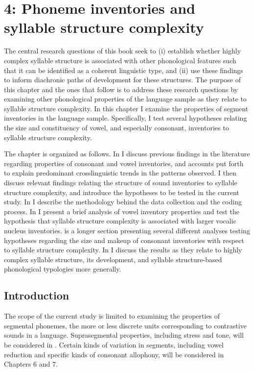 \chapter{4: Phoneme inventories and syllable structure complexity}

  The central research questions of this book seek to (i) establish whether highly complex syllable structure is associated with other phonological features such that it can be identified as a coherent linguistic type, and (ii) use these findings to inform diachronic paths of development for these structures. The purpose of this chapter and the ones that follow is to address these research questions by examining other phonological properties of the language sample as they relate to syllable structure complexity. In this chapter I examine the properties of segment inventories in the language sample. Specifically, I test several hypotheses relating the size and constituency of vowel, and especially consonant, inventories to syllable structure complexity.

  The chapter is organized as follows. In  I discuss previous findings in the literature regarding properties of consonant and vowel inventories, and accounts put forth to explain predominant crosslinguistic trends in the patterns observed. I then discuss relevant findings relating the structure of sound inventories to syllable structure complexity, and introduce the hypotheses to be tested in the current study. In  I describe the methodology behind the data collection and the coding process. In  I present a brief analysis of vowel inventory properties and test the hypothesis that syllable structure complexity is associated with larger vocalic nucleus inventories.  is a longer section presenting several different analyses testing hypotheses regarding the size and makeup of consonant inventories with respect to syllable structure complexity. In  I discuss the results as they relate to highly complex syllable structure, its development, and syllable structure-based phonological typologies more generally.

\section{Introduction}\label{sec:4.1}

  The scope of the current study is limited to examining the properties of segmental phonemes, the more or less discrete units corresponding to contrastive sounds in a language. Suprasegmental properties, including stress and tone, will be considered in . Certain kinds of variation in segments, including vowel reduction and specific kinds of consonant allophony, will be considered in Chapters 6 and 7.

